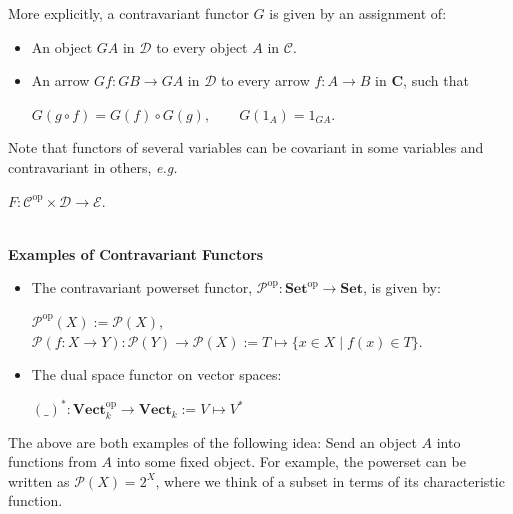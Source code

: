 \documentclass[]{amsbook}
\newcommand{\qq}{\qquad}
\newcommand{\catname}[1]{\mathbf{#1}}
\newcommand{\0}{\mathbf{0}}
\newcommand{\1}{\mathbf{1}}
\newcommand{\mc}[1]{\mathcal{#1}}
\begin{document}
More explicitly, a contravariant functor $G$ is given by an assignment of:
\begin{itemize}
    \item An object $GA$ in $\mc{D}$ to every object $A$ in $\mc{C}$.
    \item An arrow $Gf: GB \to GA$ in $\mc{D}$ to every arrow $f: A \to B$ in
    $\catname{C}$, such that
    \begin{center}
        $G(g \circ f) = G(f) \circ G(g), \qq G(1_A) = 1_{GA}$.
    \end{center}
\end{itemize}
Note that functors of several variables can be covariant in some variables and
contravariant in others, \emph{e.g.}
\begin{center}
    $F: \mc{C}^{\text{op}} \times \mc{D} \to \mc{E}$.
\end{center}
~\\

\textbf{Examples of Contravariant Functors}
\begin{itemize}
    \item The contravariant powerset functor, $\mc{P}^{\text{op}}:
    \catname{Set}^{\text{op}} \to \catname{Set}$, is given by:
    \begin{center}
        $\mc{P}^{\text{op}}(X) := \mc{P}(X)$,\\
        $\mc{P}(f: X \to Y): \mc{P}(Y) \to \mc{P}(X) := T \mapsto
        \{ x \in X \mid f(x) \in T \}$.
    \end{center}

    \item The dual space functor on vector spaces:
    \begin{center}
        $(\_)^* : \mathbf{Vect}_k^{\text{op}} \to \mathbf{Vect}_k :=
        V \mapsto V^*$
    \end{center}
\end{itemize}

The above are both examples of the following idea: Send an object $A$ into
functions from $A$ into some fixed object. For example, the powerset can be
written as $\mc{P}(X) = 2^X$, where we think of a subset in terms of its
characteristic function.\\
\end{document}
